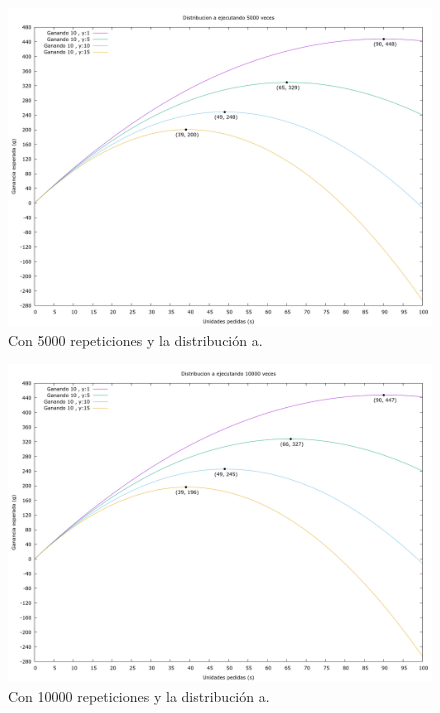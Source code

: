 \documentclass[12pt, spanish]{article}
\begin{document}
\begin{figure}[H]
	\centering
	\includegraphics[scale = 0.2]{prob_a/datos_a_5000.png}
	\caption{Con 5000 repeticiones y la distribución a.}
	\label{fig:ej1_a_5000}

\end{figure}


\begin{figure}[H]
	\centering
	\includegraphics[scale = 0.2]{prob_a/datos_a_10000.png}
	\caption{Con 10000 repeticiones y la distribución a.}
	\label{fig:ej1_a_10000}

\end{figure}
\end{document}
